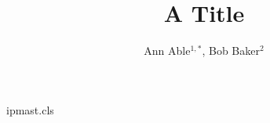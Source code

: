 \begin{filecontents*}[overwrite]{ipmast.cls}
\renewcommand{\author}[1]{{\raggedright #1\par}}
\newcommand{\affil}[1]{{\small\raggedright #1\par}}
\end{filecontents*}
\documentclass{ipmast}

\title{A Title}
\author{Ann Able$^{1,*}$, Bob Baker$^{2}$}




\maketitle
Text.

